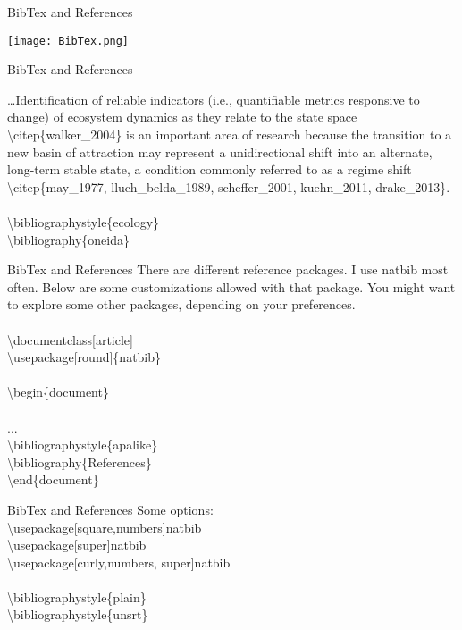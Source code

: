 \documentclass[xcolor=dvipsnames]{beamer}
\begin{document}
\begin{frame}{\LARGE{BibTex and References}}
\begin{center}
 \texttt{[image: BibTex.png]}
 \end{center}
\end{frame}

\begin{frame}{\LARGE{BibTex and References}}

\ldots Identification of reliable indicators (i.e., quantifiable metrics responsive to change) of ecosystem dynamics as they relate to the state space \textbackslash citep\{walker\_2004\} is an important area of research because the transition to a new basin of attraction may represent a unidirectional shift into an alternate, long-term stable state, a condition commonly referred to as a regime shift \textbackslash citep\{may\_1977, lluch\_belda\_1989, scheffer\_2001, kuehn\_2011, drake\_2013\}.\\~\\ 

\textbackslash bibliographystyle\{ecology\}\\
\textbackslash bibliography\{oneida\}
\end{frame}


\begin{frame}{\LARGE{BibTex and References}}
There are different reference packages. I use natbib most often. Below are some customizations allowed with that package. You might want to explore some other packages, depending on your preferences.\\~\\

\textbackslash documentclass[article]\\
\textbackslash usepackage[round]\{natbib\}\\~\\
\textbackslash begin\{document\}\\~\\
...\\
\textbackslash bibliographystyle\{apalike\}\\
\textbackslash bibliography\{References\}\\

\textbackslash end\{document\}
\end{frame}

\begin{frame}{\LARGE{BibTex and References}}
Some options:\\
\textbackslash usepackage[square,numbers]{natbib}\\
\textbackslash usepackage[super]{natbib}\\
\textbackslash usepackage[curly,numbers, super]{natbib}\\~\\

\textbackslash bibliographystyle\{plain\}\\
\textbackslash bibliographystyle\{unsrt\}\\
\end{frame}
\end{document}
